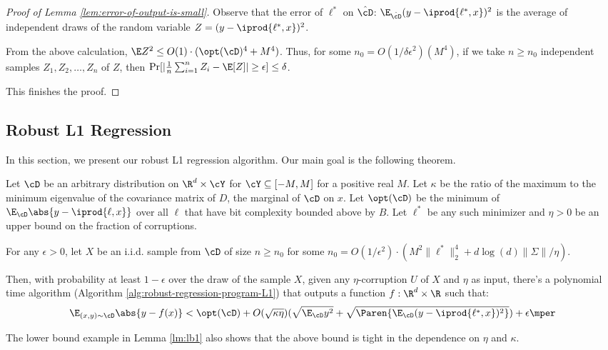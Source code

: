 {\begin{proof}[Proof of Lemma \ref{lem:error-of-output-is-small}]
Observe that the error of $\ell^{*}$ on $\hat{\cD}$: $\E_{\hat{\cD}} (y - \iprod{\ell^{*},x})^2$ is the average of independent draws of the random variable $Z= (y - \iprod{\ell^{*},x})^2$. 

From the above calculation, $\E Z^2 \leq O(1) \cdot (\opt(\cD)^4 + M^4)$. Thus, for some $n_0 = O(1/\delta \epsilon^2) (M^4)$, if we take $n \geq n_0$ independent samples $Z_1, Z_2, \ldots,Z_n$ of $Z$, then $\Pr[ |\frac{1}{n} \sum_{i = 1}^n Z_i - \E[Z]| \geq \epsilon] \leq \delta$. 

This finishes the proof. 


\end{proof}
}
\subsection{Robust L1 Regression} \label{sec:robust-L1-regression-algo}
In this section, we present our robust L1 regression algorithm. Our main goal is the following theorem. 

\begin{theorem} \label{thm:L1-regression-analysis}
Let $\cD$ be an arbitrary distribution on $\R^d \times \cY$ for $\cY \subseteq [-M,M]$ for a positive real $M$. Let $\kappa$ be the ratio of the maximum to the minimum eigenvalue of the covariance matrix of $D$, the marginal of $\cD$ on $x$. Let $\opt(\cD)$ be the minimum of $\E_{\cD} \abs{y-\iprod{\ell,x}}$ over all $\ell$ that have bit complexity bounded above by $B$. Let $\ell^{*}$ be any such minimizer and $\eta > 0$ be an upper bound on the fraction of corruptions. 

For any $\epsilon > 0$, let $X$ be an i.i.d. sample from $\cD$ of size $n \geq n_0$ for some $n_0 = O(1/\epsilon^2) \cdot (M^2\|\ell^{*}\|_2^4 + d \log{(d)} \|\Sigma\|/\eta)$.

Then, with probability at least $1-\epsilon$ over the draw of the sample $X$, given any $\eta$-corruption $U$ of $X$ and $\eta$ as input, there's a polynomial time algorithm (Algorithm \ref{alg:robust-regression-program-L1}) that outputs a function $f:\R^d \times \R$ such that:
\[
\E_{(x,y) \sim \cD} \abs{y- f(x)} < \opt(\cD) + O(\sqrt{\kappa \eta}) (\sqrt{\E_{\cD} y^2} + \sqrt{\Paren{\E_{\cD} (y-\iprod{\ell^{*},x})^2}}) + \epsilon \mper
\] 

\end{theorem}
\begin{remark}
The lower bound example in Lemma \ref{lm:lb1} also shows that the above bound is tight in the dependence on $\eta$ and $\kappa$.
\end{remark}




